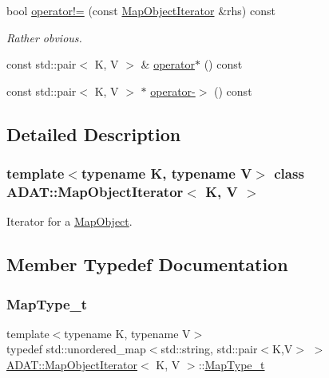 \begin{DoxyCompactItemize}
bool \mbox{\hyperlink{classADAT_1_1MapObjectIterator_a1110663c46b0e652d8ecd0dbe80bd255}{operator!=}} (const \mbox{\hyperlink{classADAT_1_1MapObjectIterator}{Map\+Object\+Iterator}} \&rhs) const
\begin{DoxyCompactList}\small\item\em Rather obvious. \end{DoxyCompactList}\item 
const std\+::pair$<$ K, V $>$ \& \mbox{\hyperlink{classADAT_1_1MapObjectIterator_a3faecdcae68181e91e40dad404296ed7}{operator$\ast$}} () const
\item 
const std\+::pair$<$ K, V $>$ $\ast$ \mbox{\hyperlink{classADAT_1_1MapObjectIterator_aa56a13020c9fac807f99312923610dbd}{operator-\/$>$}} () const
\end{DoxyCompactItemize}


\subsection{Detailed Description}
\subsubsection*{template$<$typename K, typename V$>$\newline
class A\+D\+A\+T\+::\+Map\+Object\+Iterator$<$ K, V $>$}

Iterator for a \mbox{\hyperlink{classADAT_1_1MapObject}{Map\+Object}}. 

\subsection{Member Typedef Documentation}
\mbox{\label{classADAT_1_1MapObjectIterator_ad159a70384669e35c10ddb298c4d1ba8}} 
\subsubsection{\texorpdfstring{MapType\_t}{MapType\_t}\hspace{0.1cm}{\footnotesize\ttfamily [1/2]}}
{\footnotesize\ttfamily template$<$typename K, typename V$>$ \\
typedef std\+::unordered\+\_\+map$<$std\+::string, std\+::pair$<$K,V$>$ $>$ \mbox{\hyperlink{classADAT_1_1MapObjectIterator}{A\+D\+A\+T\+::\+Map\+Object\+Iterator}}$<$ K, V $>$\+::\mbox{\hyperlink{classADAT_1_1MapObjectIterator_ad159a70384669e35c10ddb298c4d1ba8}{Map\+Type\+\_\+t}}}



